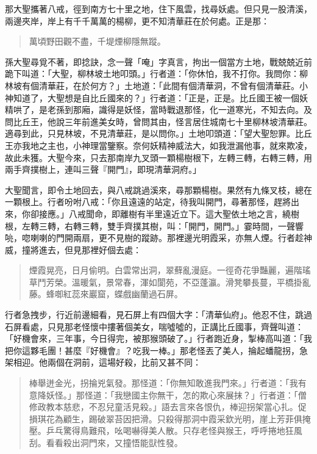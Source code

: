 那大聖攜著八戒，徑到南方七十里之地，住下風雲，找尋妖處。但只見一股清溪，兩邊夾岸，岸上有千千萬萬的楊柳，更不知清華莊在於何處。正是那：
\begin{quote}
萬頃野田觀不盡，千堤煙柳隱無蹤。
\end{quote}

孫大聖尋覓不著，即捻訣，念一聲「唵」字真言，拘出一個當方土地，戰兢兢近前跪下叫道：「大聖，柳林坡土地叩頭。」行者道：「你休怕，我不打你。我問你：柳林坡有個清華莊，在於何方？」土地道：「此間有個清華洞，不曾有個清華莊。小神知道了，大聖想是自比丘國來的？」行者道：「正是，正是。比丘國王被一個妖精哄了，是老孫到那廂，識得是妖怪，當時戰退那怪，化一道寒光，不知去向。及問比丘王，他說三年前進美女時，曾問其由，怪言居住城南七十里柳林坡清華莊。適尋到此，只見林坡，不見清華莊，是以問你。」土地叩頭道：「望大聖恕罪。比丘王亦我地之主也，小神理當鑒察。奈何妖精神威法大，如我泄漏他事，就來欺凌，故此未獲。大聖今來，只去那南岸九叉頭一顆楊樹根下，左轉三轉，右轉三轉，用兩手齊撲樹上，連叫三聲『開門』，即現清華洞府。」

大聖聞言，即令土地回去，與八戒跳過溪來，尋那顆楊樹。果然有九條叉枝，總在一顆根上。行者吩咐八戒：「你且遠遠的站定，待我叫開門，尋著那怪，趕將出來，你卻接應。」八戒聞命，即離樹有半里遠近立下。這大聖依土地之言，繞樹根，左轉三轉，右轉三轉，雙手齊撲其樹，叫：「開門，開門。」霎時間，一聲響喨，唿喇喇的門開兩扇，更不見樹的蹤跡。那裡邊光明霞采，亦無人煙。行者趁神威，撞將進去，但見那裡好個去處：
\begin{quote}
煙霞晃亮，日月偷明。白雲常出洞，翠蘚亂漫庭。一徑奇花爭豔麗，遍階瑤草鬥芳榮。溫暖氣，景常春，渾如閬苑，不亞蓬瀛。滑凳攀長蔓，平橋掛亂藤。蜂啣紅蕊來巖窟，蝶戲幽蘭過石屏。
\end{quote}

行者急拽步，行近前邊細看，見石屏上有四個大字：「清華仙府」。他忍不住，跳過石屏看處，只見那老怪懷中摟著個美女，喘噓噓的，正講比丘國事，齊聲叫道：「好機會來，三年事，今日得完，被那猴頭破了。」行者跑近身，掣棒高叫道：「我把你這夥毛團！甚麼『好機會』？吃我一棒。」那老怪丟了美人，掄起蟠龍拐，急架相迎。他兩個在洞前，這場好殺，比前又甚不同：
\begin{quote}
棒舉迸金光，拐掄兇氣發。那怪道：「你無知敢進我門來。」行者道：「我有意降妖怪。」那怪道：「我戀國主你無干，怎的欺心來展抹？」行者道：「僧修政教本慈悲，不忍兒童活見殺。」語去言來各恨仇，棒迎拐架當心扎。促損琪花為顧生，踢破翠苔因把滑。只殺得那洞中霞采欽光明，崖上芳菲俱掩壓。乒乓驚得鳥難飛，吆喝嚇得美人散。只存老怪與猴王，呼呼捲地狂風刮。看看殺出洞門來，又撞悟能獃性發。
\end{quote}

